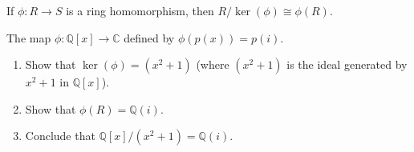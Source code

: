 \begin{fact}
If $\phi:R\to S$ is a ring homomorphism, then  $R/\ker(\phi)\cong \phi(R)$.
\end{fact}

\begin{problem}
The map $\phi: \mathbb{Q}[x] \rightarrow \mathbb{C}$ defined by $\phi(p(x)) = p(i)$. 
\begin{enumerate}
\item Show that $\ker(\phi) = (x^2+1)$ (where $(x^2+1)$ is the ideal generated by $x^2+1$ in $\mathbb{Q}[x]$).
\item Show that $\phi(R) = \mathbb{Q}(i)$.
\item Conclude that $ \mathbb{Q}[x]/(x^2+1) = \mathbb{Q}(i)$.
\end{enumerate}
\end{problem}




